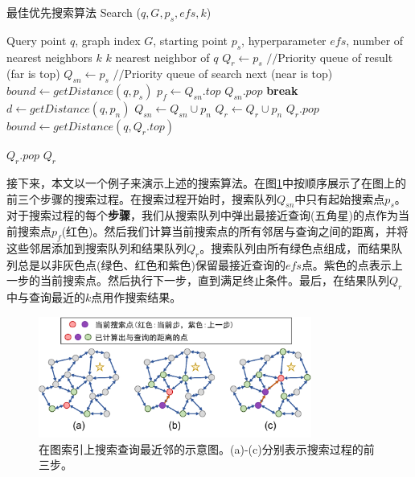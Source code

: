 \begin{algorithm}[t]
  \caption{最佳优先搜索算法 Search ($q, G, p_s, efs, k$)}
  \begin{algorithmic}[1]
    \REQUIRE 
    Query point $q$, graph index $G$, starting point $p_s$, hyperparameter $efs$, number of nearest neighbors $k$
    \ENSURE
    $k$ nearest neighbor of $q$
    \label{alg:search}
    \STATE $Q_r \gets p_s$ $//$Priority queue of result (far is top)
    \STATE $Q_{sn} \gets p_s$ $//$Priority queue of search next (near is top)
    \STATE $bound \gets getDistance(q,p_s)$
      \STATE $p_f \gets Q_{sn}.top$
      \STATE $Q_{sn}.pop$
        \STATE \textbf{break}
      \ENDIF
        \STATE $d \gets getDistance(q,p_n)$
          \STATE $Q_{sn} \gets Q_{sn} \cup p_n$
          \STATE $Q_r \gets Q_r \cup p_n$
            \STATE $Q_r.pop$
          \ENDIF
          \STATE $bound \gets getDistance(q,Q_r.top)$
        \ENDIF
      \ENDFOR
    \ENDWHILE
    
    \STATE $Q_r.pop$
    \ENDWHILE
    \RETURN $Q_r$
  \end{algorithmic} 
\end{algorithm}


接下来，本文以一个例子来演示上述的搜索算法。在图\ref{fig:search-step}中按顺序展示了在图上的前三个步骤的搜索过程。在搜索过程开始时，搜索队列$Q_{sn}$中只有起始搜索点$p_s$。对于搜索过程的每个\textbf{步骤}，我们从搜索队列中弹出最接近查询(五角星)的点作为当前搜索点$p_f$(红色)。然后我们计算当前搜索点的所有邻居与查询之间的距离，并将这些邻居添加到搜索队列和结果队列$Q_r$。搜索队列由所有绿色点组成，而结果队列总是以非灰色点(绿色、红色和紫色)保留最接近查询的$efs$点。紫色的点表示上一步的当前搜索点。然后执行下一步，直到满足终止条件。最后，在结果队列$Q_r$中与查询最近的$k$点用作搜索结果。

\begin{figure}
  \centering
  \includegraphics[width=0.8\textwidth]{figures/Background/search-step.pdf}
  \caption{在图索引上搜索查询最近邻的示意图。(a)-(c)分别表示搜索过程的前三步。}
  \label{fig:search-step}
\end{figure}


